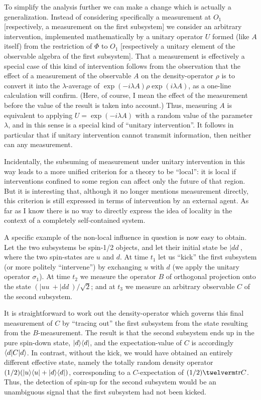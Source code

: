 \tx
To simplify the analysis further we can make a change which is
actually a generalization.  Instead of considering specifically a
measurement at $O_1$ [respectively, a measurement on the first
subsystem] we consider an arbitrary intervention, implemented
mathematically by a unitary operator $U$ formed (like $A$ itself) from
the restriction of $\Phi$ to $O_1$ [respectively a unitary element of
the observable algebra of the first subsystem].  That a measurement is
effectively a special case of this kind of intervention follows from
the observation that the effect of a measurement of the observable $A$
on the density-operator $\rho$ is to convert it into the
$\lambda$-average of $\exp(-i\lambda A) \rho \exp(i\lambda A)$, as a
one-line calculation will confirm.  (Here, of course, I mean the
effect of the measurement before the value of the result is taken into
account.)  Thus, measuring $A$ is equivalent to applying
$U=\exp(-i\lambda A)$ with a random value of the parameter $\lambda$,
and in this sense is a special kind of ``unitary intervention''.  It
follows in particular that if unitary intervention cannot transmit
information, then neither can any measurement.

\tx
Incidentally, the subsuming of measurement under unitary intervention
in this way leads to a more unified criterion for a theory to be
``local'': it is local if interventions confined to some region can
affect only the future of that region.  But it is interesting that,
although it no longer mentions measurement directly, this criterion is
still expressed in terms of intervention by an external agent.  As far
as I know there is no way to directly express the idea of locality in
the context of a completely self-contained system.

\tx
A specific example of the non-local influence in question is now easy
to obtain.  Let the two subsystems be spin-1/2 objects, and let their
initial state be $|dd\>$, where the two spin-states are $u$ and $d$.
At time $t_1$ let us ``kick'' the first subsystem (or more politely
``intervene'') by exchanging $u$ with $d$ (we apply the unitary
operator $\sigma_1$).  At time $t_2$ we measure the operator $B$ of
orthogonal projection onto the state $( |uu\> + |dd\>)/ \sqrt{2}$; and
at $t_3$ we measure an arbitrary observable $C$ of the second
subsystem.

\tx
It is straightforward to work out the density-operator which governs
this final measurement of $C$ by ``tracing out'' the first subsystem
from the state resulting from the $B$-measurement.  The result is that
the second subsystem ends up in the pure spin-down state, $|d\rangle\langle d|$,
and the expectation-value of $C$ is accordingly $\langle d|C|d\rangle$.  In
contrast, without the kick, we would have obtained an entirely
different effective state, namely the totally random density operator
$(1/2) (|u\rangle\langle u| + |d\rangle\langle d|)$, corresponding to a $C$-expectation of
$(1/2) \tr C$.  Thus, the detection of spin-up for the second
subsystem would be an unambiguous signal that the first subsystem had
not been kicked.

